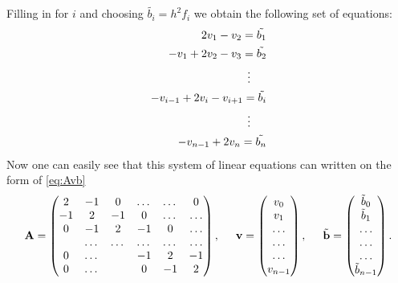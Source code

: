 \documentclass[11pt,a4paper,english]{article}
\numberwithin{equation}{section}
\newcommand{\ve}[1]{\mathbf{#1}} %
\newcommand{\spac}{\hspace{5mm}}
\begin{document}
Filling in for $i$ and choosing $\tilde{b_i} = h^2 f_i$ we obtain the following set of equations: 
\begin{align*}
	2v_{1}-v_{2}=\tilde{b_1} \\
	-v_{1}+2v_{2}-v_{3}=\tilde{b_2} \\
	\vdots \hspace{0.5cm} \\
	-v_{i-1}+2v_{i}-v_{i+1}=\tilde{b_i} \\
	\vdots \hspace{0.5cm}  \\ 
	-v_{n-1}+2v_{n}=\tilde{b_n} \\
\end{align*}
Now one can easily see that this system of linear equations can written on the form of \eqref{eq:Avb}
\begin{gather*}
    \ve{A} = \begin{pmatrix}
                           2& -1& 0 &\dots   & \dots &0 \\
                           -1 & 2 & -1 &0 &\dots &\dots \\
                           0&-1 &2 & -1 & 0 & \dots \\
                           & \dots   & \dots &\dots   &\dots & \dots \\
                           0&\dots   &  &-1 &2& -1 \\
                           0&\dots    &  & 0  &-1 & 2 \\
                      \end{pmatrix},\spac \ve{v} = \begin{pmatrix}
                           v_0\\
                           v_1\\
                           \dots \\
                          \dots  \\
                          \dots \\
                           v_{n-1}\\
                      \end{pmatrix},
  \spac \tilde{\ve{b}} = \begin{pmatrix}
                           \tilde{b}_0\\
                           \tilde{b}_1\\
                           \dots \\
                           \dots \\
                          \dots \\
                           \tilde{b}_{n-1}\\
                      \end{pmatrix}.
\end{gather*}
\end{document}
